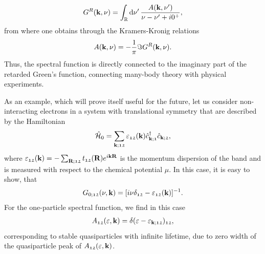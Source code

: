 \documentclass[../../main.tex]{subfiles}
\begin{document}
\begin{align}
	G^{R}(\textbf{k},\nu)=\int_{\mathbb{R}}^{}\text{d}\nu'\,\frac{A(\textbf{k},\nu')}{\nu-\nu'+i 0^{+}},
\end{align}
from where one obtains through the Kramers-Kronig relations
\begin{align}
	A(\textbf{k},\nu) = -\frac1\pi \Im G^{R}(\textbf{k},\nu).
\end{align}
Thus, the spectral function is directly connected to the imaginary part of the retarded Green's function, connecting many-body theory with physical experiments.

As an example, which will prove itself useful for the future, let us consider non-interacting electrons in a system with translational symmetry that are described by the Hamiltonian
\begin{align}
	\hat{\mathcal{H}}_0=\sum_{\textbf{k};\mathfrak{12}}\varepsilon_{\mathfrak{12}}(\textbf{k})\hat c^{\dagger}_{\textbf{k};\mathfrak{1}}\hat c_{\textbf{k};\mathfrak{2}},
\end{align}
where $\varepsilon_{\mathfrak{12}}(\textbf{k})=-\sum_{\textbf{R};\mathfrak{12}} t_{\mathfrak{12}}(\textbf{R})e^{i\textbf{kR}}$ is the momentum dispersion of the band and is measured with respect to the chemical potential $\mu$. In this case, it is easy to show, that 
\begin{align}\label{eq:non_interacting_one_p_green}
	G_{0;\mathfrak{12}}(\nu, \textbf{k})=[i\nu\delta_{\mathfrak{12}}-\varepsilon_{\mathfrak{12}}(\textbf{k})]^{-1}.
\end{align}
For the one-particle spectral function, we find in this case 
\begin{align}
	A_{\mathfrak{12}}(\varepsilon,\textbf{k})=\delta(\varepsilon-\varepsilon_{\textbf{k};\mathfrak{12}})_{\mathfrak{12}},
\end{align}
corresponding to stable quasiparticles with infinite lifetime, due to zero width of the quasiparticle peak of $A_{\mathfrak{12}}(\varepsilon,\textbf{k})$.
\end{document}
